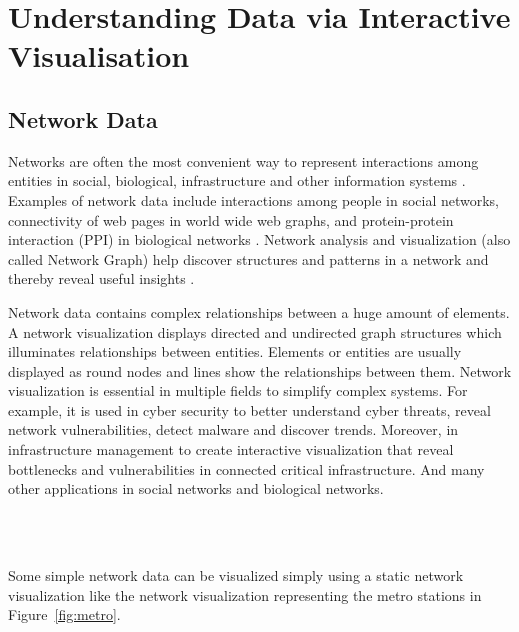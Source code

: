 \section{Understanding Data via Interactive Visualisation}
\subsection{Network Data}


Networks are often the most convenient way to represent interactions among entities in social, biological, infrastructure and other information systems \cite{becker1995visualizing, herman2000graph}. Examples of network data include interactions among people in social networks, connectivity of web pages in world wide web graphs, and protein-protein interaction (PPI) in biological networks \cite{leskovec2014snap, arifuzzaman2017scalable}. Network analysis and visualization (also called Network Graph) help discover structures and patterns in a network and thereby reveal useful insights \cite{herman2000graph, arifuzzaman2015space, arifuzzaman2012patric, arifuzzaman2017scalable, arifuzzaman2015fast}.


Network data contains complex relationships between a huge amount of elements. A network visualization displays directed and undirected graph structures which illuminates relationships between entities. Elements or entities are usually displayed as round nodes and lines show the relationships between them. Network visualization is essential in multiple fields to simplify complex systems. For example, it is used in cyber security to better understand cyber threats, reveal network vulnerabilities, detect malware and discover trends. Moreover, in infrastructure management to create interactive visualization that reveal bottlenecks and vulnerabilities in connected critical infrastructure. And many other applications in social networks and biological networks. 

\\\

Some simple network data can be visualized simply using a static network visualization like the network visualization representing the metro stations in Figure~\ref{fig:metro}.

